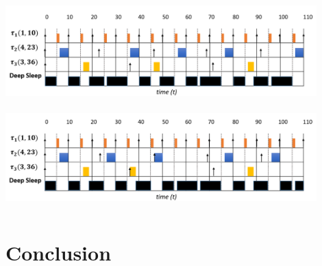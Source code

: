 \begin{center}
\includegraphics[height=4cm,width=12cm]{rhs.png}
\label{fig:exempleRHS}
\includegraphics[height=4cm,width=12cm]{rhs+.png}
\label{fig:exempleRHS+}
\end{center}

\section{Conclusion}
\vspace{-1cm}